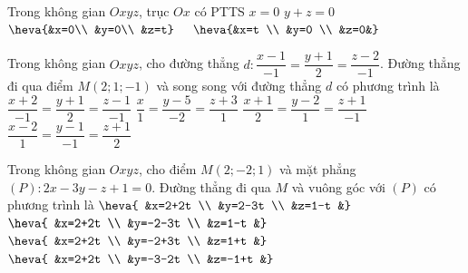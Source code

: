 \begin{ex}%
	Trong không gian $Oxyz$, trục $Ox$ có PTTS
	\choice
	{$x=0$}
	{$y+z=0$}
	{$\heva{&x=0\\
			&y=0\\
			&z=t} \quad$}
	{\True $\heva{&x=t \\
			&y=0 \\
			&z=0&}$}
\end{ex}
\begin{ex}%
	Trong không gian $Oxyz$, cho đường thẳng $d\colon \dfrac{x-1}{-1}=\dfrac{y+1}{2}=\dfrac{z-2}{-1}$. Đường thẳng đi qua điểm $M(2; 1;-1)$ và song song với đường thẳng $d$ có phương trình là
	\choice
	{$\dfrac{x+2}{-1}=\dfrac{y+1}{2}=\dfrac{z-1}{-1}$}
	{\True $\dfrac{x}{1}=\dfrac{y-5}{-2}=\dfrac{z+3}{1}$}
	{$\dfrac{x+1}{2}=\dfrac{y-2}{1}=\dfrac{z+1}{-1}$}
	{$\dfrac{x-2}{1}=\dfrac{y-1}{-1}=\dfrac{z+1}{2}$}
\end{ex}
\begin{ex}%
	Trong không gian $Oxyz$, cho điểm $M(2;-2; 1)$ và mặt phẳng $(P)\colon 2x-3y-z+1=0$. Đường thẳng đi qua $M$ và vuông góc với $(P)$ có phương trình là
	\choice
	{$\heva{	&x=2+2t \\
			&y=2-3t \\
			&z=1-t
			&}$}
	{\True $\heva{	&x=2+2t \\
			&y=-2-3t \\
			&z=1-t
			&}$}
	{$\heva{	&x=2+2t \\
			&y=-2+3t \\
			&z=1+t
			&}$}
	{$\heva{	&x=2+2t \\
			&y=-3-2t \\
			&z=-1+t
			&}$}
\end{ex}
